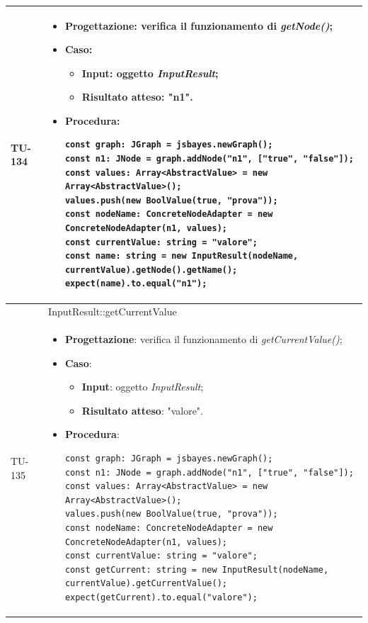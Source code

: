 \begin{longtable}{|C{1.5cm}|C{14.5cm}|}
\\ \hline
{TU-134} &
\begin{itemize}
	\item \textbf{Progettazione}: verifica il funzionamento di \emph{getNode()};
	\item \textbf{Caso}: 
	\begin{itemize}
		\item \textbf{Input}: oggetto \emph{InputResult};
		\item \textbf{Risultato atteso}: "n1".
	\end{itemize}
	\item \textbf{Procedura}:
	\begin{lstlisting}
const graph: JGraph = jsbayes.newGraph();
const n1: JNode = graph.addNode("n1", ["true", "false"]);
const values: Array<AbstractValue> = new Array<AbstractValue>();
values.push(new BoolValue(true, "prova"));
const nodeName: ConcreteNodeAdapter = new ConcreteNodeAdapter(n1, values);
const currentValue: string = "valore";
const name: string = new InputResult(nodeName, currentValue).getNode().getName();
expect(name).to.equal("n1");
	\end{lstlisting}
\end{itemize}\\
\hline
{} & InputResult::getCurrentValue
\\ \hline
{TU-135} &
\begin{itemize}
	\item \textbf{Progettazione}: verifica il funzionamento di \emph{getCurrentValue()};
	\item \textbf{Caso}: 
	\begin{itemize}
		\item \textbf{Input}: oggetto \emph{InputResult};
		\item \textbf{Risultato atteso}: "valore".
	\end{itemize}
	\item \textbf{Procedura}:
	\begin{lstlisting}
const graph: JGraph = jsbayes.newGraph();
const n1: JNode = graph.addNode("n1", ["true", "false"]);
const values: Array<AbstractValue> = new Array<AbstractValue>();
values.push(new BoolValue(true, "prova"));
const nodeName: ConcreteNodeAdapter = new ConcreteNodeAdapter(n1, values);
const currentValue: string = "valore";
const getCurrent: string = new InputResult(nodeName, currentValue).getCurrentValue();
expect(getCurrent).to.equal("valore");
	\end{lstlisting}
\end{itemize}\\

\end{longtable}
